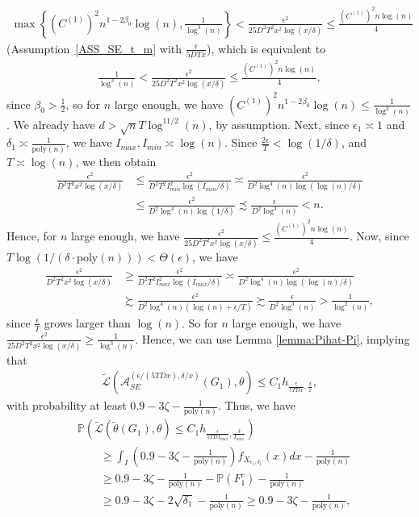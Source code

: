 \documentclass{article}
\begin{document}
\begin{align*}
\max\left\{(C^{(1)})^2n^{1 - 2\beta_0}\log(n), \frac{1}{\log^3(n)}\right\} < \frac{\epsilon^2}{25D^2T^2x^2\log(x/\delta)} \leq \frac{(C^{(1)})^2n\log(n)}{4}
\end{align*}
(Assumption~\ref{ASS_SE_t_m} with $\frac{\epsilon}{5DTx}$), which is equivalent to 
\begin{align*}
\frac{1}{\log^3(n)} < \frac{\epsilon^2}{25D^2T^2x^2\log(x/\delta)} \leq \frac{(C^{(1)})^2n\log(n)}{4},
\end{align*}
since $\beta_0 > \frac{1}{2}$, so for $n$ large enough, we have $(C^{(1)})^2n^{1 - 2\beta_0}\log(n) \leq \frac{1}{\log^3(n)}$. We already have $d > \sqrt{n}T\log^{11/2}(n)$, by assumption. Next, since $\epsilon_1 \asymp 1$ and $\delta_1 \asymp \frac{1}{\mathrm{poly}(n)}$, we have $I_{max}, I_{min} \asymp \log(n)$. Since $\frac{2\epsilon}{T} < \log(1/\delta)$, and $T \asymp \log(n)$, we then obtain
\begin{align*}
\frac{\epsilon^2}{D^2T^2x^2\log(x/\delta)} & \leq \frac{\epsilon^2}{D^2T^2I_{min}^2\log(I_{min}/\delta)} \asymp \frac{\epsilon^2}{D^2\log^4(n)\log(\log(n)/\delta)} \\
& \leq \frac{\epsilon^2}{D^2\log^4(n)\log(1/\delta)} \precsim \frac{\epsilon}{D^2\log^3(n)} < n.
\end{align*}
Hence, for $n$ large enough, we have $\frac{\epsilon^2}{25D^2T^2x^2\log(x/\delta)} \leq \frac{(C^{(1)})^2n\log(n)}{4}$. Now, since $T\log(1/(\delta \cdot \mathrm{poly}(n))) < \Theta(\epsilon)$, we have
\begin{align*}
\frac{\epsilon^2}{D^2T^2x^2\log(x/\delta)} &\geq \frac{\epsilon^2}{D^2T^2I_{max}^2\log(I_{max}/\delta)} \asymp \frac{\epsilon^2}{D^2\log^4(n)\log(\log(n)/\delta)} \\
%
& \succsim \frac{\epsilon^2}{D^2\log^4(n)(\log(n) + \epsilon/T)} \succsim \frac{\epsilon}{D^2\log^3(n)} > \frac{1}{\log^2(n)},
\end{align*}
since $\frac{\epsilon}{T}$ grows larger than $\log(n)$. So for $n$ large enough, we have $\frac{\epsilon^2}{25D^2T^2x^2\log(x/\delta)} \geq \frac{1}{\log^3(n)}$. Hence, we can use Lemma \ref{lemma:Pihat-Pi}, implying that 
\begin{align*}
\widetilde{\mathcal{L}}\left(\mathcal{A}_{SE}^{(\epsilon/(5TDx), \delta/x)}(G_1), \theta\right) \leq C_1h_{\frac{\epsilon}{5TDx}, \frac{\delta}{x}},
\end{align*}
with probability at least $0.9 - 3\zeta - \frac{1}{\mathrm{poly}(n)}$. Thus, we have
\begin{align*}
& \mathbb{P}\left(\widetilde{\mathcal{L}}\left(\widetilde{\theta}(G_1), \theta\right) \leq C_1h_{\frac{\epsilon}{5TDI_{max}}, \frac{\delta}{I_{max}}}\right) \\
%
&\qquad \geq \int_I\left(0.9 - 3\zeta - \frac{1}{\mathrm{poly}(n)}\right)f_{X_{\epsilon_1, \delta_1}}(x)dx - \frac{1}{\mathrm{poly}(n)}\\
& \qquad \geq 0.9 - 3\zeta - \frac{1}{\mathrm{poly}(n)} - \mathbb{P}(F_1^c) - \frac{1}{\mathrm{poly}(n)}\\
& \qquad \geq  0.9 - 3\zeta - 2\sqrt{\delta_1} - \frac{1}{\mathrm{poly}(n)} \geq 0.9 - 3\zeta - \frac{1}{\mathrm{poly}(n)},
\end{align*}
\end{document}
